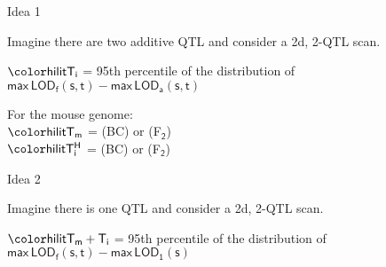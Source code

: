 \documentclass[aspectratio=169,12pt,t]{beamer}
\newcommand{\lod}{\text{LOD}}
\begin{document}
\addtocounter{page}{-1}

\begin{frame}{Idea 1}


\hfill \begin{minipage}{10in}

Imagine there are two additive QTL and consider a 2d, 2-QTL scan.

\vspace{1cm}

\hspace*{0.5in} $\mathsf{\hilit T_i}$ = 95th percentile of the
  distribution of \\[6pt]
\hspace*{1.3in} {\lolit $\mathsf{ \text{max} \, \lod_f(s,t) -
    \text{max} \, \lod_a(s,t)}$}


\vspace{2cm}

For the mouse genome: \\[12pt]
\hspace*{0.5in} $\mathsf{\hilit T_m}$ = {} (BC) or {} (F$_{\mathsf{2}}$) \\[12pt]
\hspace*{0.5in} $\mathsf{\hilit T^H_i}$ = {} (BC) or {} (F$_{\mathsf{2}}$)


\end{minipage}



\note{
}
\end{frame}







\begin{frame}{Idea 2}


\hfill \begin{minipage}{10in}

Imagine there is one QTL and consider a 2d, 2-QTL scan.

\vspace{1cm}

\hspace*{0.5in} $\mathsf{\hilit T_m + T_i}$ = 95th percentile of the
  distribution of \\[6pt]
\hspace*{2.0in} {\lolit $\mathsf{ \text{max} \, \lod_f(s,t) -
    \text{max} \, \lod_1(s)}$}


\end{minipage}



\note{
}
\end{frame}
\end{document}
